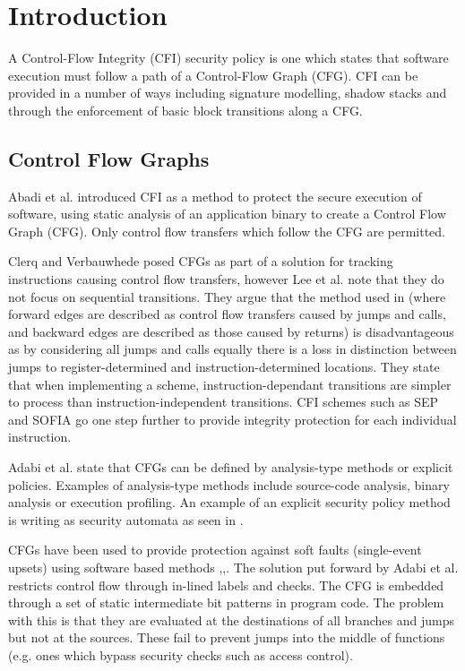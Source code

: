 \section{Introduction}
A Control-Flow Integrity (CFI) security policy is one which states that software execution must follow a path of a Control-Flow Graph (CFG). CFI can be provided in a number of ways including signature modelling, shadow stacks and through the enforcement of basic block transitions along a CFG.

\subsection{Control Flow Graphs}
Abadi et al. \cite{Abadi2005} introduced CFI as a method to protect the secure execution of software, using static analysis of an application binary to create a Control Flow Graph (CFG). Only control flow transfers which follow the CFG are permitted.

Clerq and Verbauwhede \cite{DeClercq2017} posed CFGs as part of a solution for tracking instructions causing control flow transfers, however Lee et al. \cite{Lee2019} note that they do not focus on sequential transitions. They argue that the method used in \cite{DeClercq2017} (where forward edges are described as control flow transfers caused by jumps and calls, and backward edges are described as those caused by returns) is disadvantageous as by considering all jumps and calls equally there is a loss in distinction between jumps to register-determined and instruction-determined locations. They state that when implementing a scheme, instruction-dependant transitions are simpler to process than instruction-independent transitions. CFI schemes such as SEP \cite{Lee2019} and SOFIA \cite{DeClercq2017b} go one step further to provide integrity protection for each individual instruction.

Adabi et al. \cite{Abadi2005} state that CFGs can be defined by analysis-type methods or explicit policies. Examples of analysis-type methods include source-code analysis, binary analysis or execution profiling. An example of an explicit security policy method is writing as security automata as seen in \cite{Erlingsson2004}. 
\ifnotesincluded
{}
\fi

CFGs have been used to provide protection against soft faults (single-event upsets) using software based methods \cite{Oh2002},\cite{Sharma2012},\cite{Venkatasubramanian2003}. 
The solution put forward by Adabi et al. \cite{Abadi2005} restricts control flow through in-lined labels and checks. The CFG is embedded through a set of static intermediate bit patterns in program code. The problem with this is that they are evaluated at the destinations of all branches and jumps but not at the sources. These fail to prevent jumps into the middle of functions (e.g. ones which bypass security checks such as access control).


